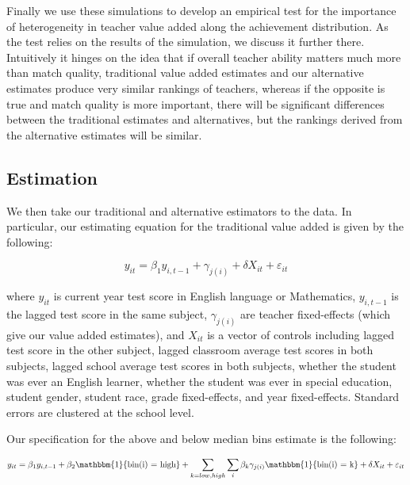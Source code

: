 \documentclass[letterpaper,12pt]{article}
\begin{document}
Finally we use these simulations to develop an empirical test for the importance of heterogeneity in teacher value added along the achievement distribution. As the test relies on the results of the simulation, we discuss it further there. Intuitively it hinges on the idea that if overall teacher ability matters much more than match quality, traditional value added estimates and our alternative estimates produce very similar rankings of teachers, whereas if the opposite is true and match quality is more important, there will be significant differences between the traditional estimates and alternatives, but the rankings derived from the alternative estimates will be similar.




\subsection{Estimation}

We then take our traditional and alternative estimators to the data. In particular, our estimating equation for the traditional value added is given by the following:

    \begin{equation}
        y_{it} = \beta_1 y_{i,t-1} + \gamma_{j(i)} + \delta X_{it} + \varepsilon_{it}
    \end{equation}
    
\noindent where $y_{it}$ is current year test score in English language or Mathematics, $y_{i,t-1}$ is the lagged test score in the same subject, $\gamma_{j(i)}$ are teacher fixed-effects (which give our value added estimates), and $X_{it}$ is a vector of controls including lagged test score in the other subject, lagged classroom average test scores in both subjects, lagged school average test scores in both subjects, whether the student was ever an English learner, whether the student was ever in special education, student gender, student race, grade fixed-effects, and year fixed-effects. Standard errors are clustered at the school level.

Our specification for the above and below median bins estimate is the following:

    \begin{equation}
        y_{it} = \beta_1 y_{i,t-1} + \beta_2 \mathbbm{1}\{\text{bin(i) = high}\}
        + \sum_{k=low, high}\sum_{i}\beta_k \gamma_{j(i)} \mathbbm{1}\{\text{bin(i) = k}\} + \delta X_{it} + \varepsilon_{it}
    \end{equation} 
    
\end{document}
